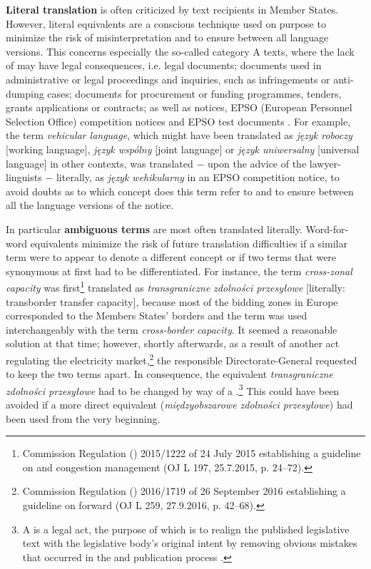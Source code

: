 \documentclass[output=paper]{langsci/langscibook}
\begin{document}
\textbf{Literal translation} is often criticized by text recipients in Member States. However, literal equivalents are a conscious technique used on purpose to minimize the risk of misinterpretation and to ensure  between all language versions. This concerns especially the so-called category A texts, where the lack of  may have legal consequences, i.e.  legal documents; documents used in administrative or legal proceedings and inquiries, such as infringements or anti-dumping cases; documents for procurement or funding programmes, tenders, grants applications or contracts; as well as  notices, EPSO (European Personnel Selection Office) competition notices and EPSO test documents \citep{DGT2017}. For example, the term \textit{vehicular language}, which might have been translated as \textit{język roboczy} [working language], \textit{język wspólny} [joint language] or \textit{język uniwersalny} [universal language] in other contexts, was translated $-$ upon the advice of the lawyer-linguists $-$ literally, as \textit{język wehikularny} in an EPSO competition notice, to avoid doubts as to which concept does this term refer to and to ensure  between all the language versions of the notice. 

In particular \textbf{ambiguous terms} are most often translated literally. Word-for-word equivalents minimize the risk of future translation difficulties if a similar term were to appear to denote a different concept or if two terms that were synonymous at first had to be differentiated. For instance, the term \textit{cross-zonal capacity} was first\footnote{Commission Regulation () 2015/1222 of 24 July 2015 establishing a guideline on  and congestion management (OJ L 197, 25.7.2015, p. 24–72).} translated as \textit{transgraniczne} \textit{zdolności przesyłowe} [literally: transborder transfer capacity], because most of the bidding zones in Europe corresponded to the Members States’ borders and the term was used interchangeably with the term \textit{cross-border capacity}. It seemed a reasonable solution at that time; however, shortly afterwards, as a result of another act regulating the electricity market,\footnote{Commission Regulation () 2016/1719 of 26 September 2016 establishing a guideline on forward  (OJ L 259, 27.9.2016, p. 42–68).} the responsible Directorate-General requested to keep the two terms apart. In consequence, the equivalent \textit{transgraniczne zdolności przesyłowe} had to be changed by way of a .\footnote{A  is a legal act, the purpose of which is to realign the published legislative text with the legislative body’s original intent by removing obvious mistakes that occurred in the  and publication process \citep[950]{Bobek2009}.} This could have been avoided if a more direct equivalent (\textit{międzyobszarowe zdolności przesyłowe}) had been used from the very beginning.
\end{document}
